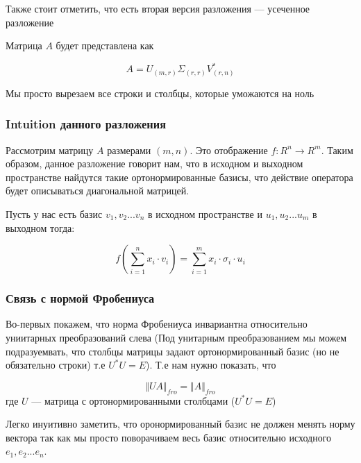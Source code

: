 \documentclass{article}
\begin{document}
    Также стоит отметить, что есть вторая версия разложения --- усеченное разложение

    Матрица $A$ будет представлена как 

    \begin{equation}
        A = U_{(m, r)} \Sigma_{(r, r)} V^{*}_{(r, n)}
    \end{equation}

    Мы просто вырезаем все строки и столбцы, которые уможаются на ноль


    \subsubsection{Intuition данного разложения}


    Рассмотрим матрицу $A$ размерами $(m, n)$. Это отображение $f:R^{n} \rightarrow R^{m}$. 
    Таким образом, данное разложение говорит нам, что в исходном и выходном пространстве найдутся такие ортонормированные базисы, что действие оператора 
    будет описываться диагональной матрицей.

    \quad 

    Пусть у нас есть базис $v_{1}, v_{2} ... v_{n}$ в исходном пространстве и $u_{1}, u_{2} ... u_{m}$ в выходном тогда: 

    \begin{equation}
        f(\sum_{i = 1}^{n}{x_{i} \cdot v_{i}}) = \sum_{i = 1}^{m}{x_{i} \cdot \sigma_{i} \cdot u_{i}}
    \end{equation}

    \subsubsection{Связь с нормой Фробениуса}

    Во-первых покажем, что норма Фробениуса инвариантна относительно униитарных преобразований слева 
    (Под унитарным преобразованием мы можем подразуемвать, что столбцы матрицы задают ортонормированный базис (но не обязательно строки) т.е $U^{*}U = E$). 
    Т.е нам нужно показать, что  

    \begin{equation}
        \Vert U  A  \Vert_{fro} = \Vert A \Vert_{fro} 
    \end{equation}
    где $U$ --- матрица с ортонормированными столбцами ($U^{*}U = E$)

    \quad 

    Легко инуитивно заметить, что оронормированный базис не должен менять норму вектора так как мы просто поворачиваем весь базис относительно исходного $e_{1}, e_{2} ... e_{n}$.
\end{document}
